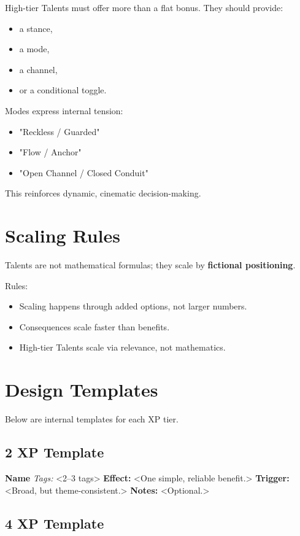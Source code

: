 \documentclass[11pt]{book}
\begin{document}
High-tier Talents must offer more than a flat bonus.
They should provide:
\begin{itemize}
    \item a stance,
    \item a mode,
    \item a channel,
    \item or a conditional toggle.
\end{itemize}

Modes express internal tension:
\begin{itemize}
    \item "Reckless / Guarded"
    \item "Flow / Anchor"
    \item "Open Channel / Closed Conduit"
\end{itemize}

This reinforces dynamic, cinematic decision-making.

\section{Scaling Rules}

Talents are not mathematical formulas; they scale by \textbf{fictional positioning}.

Rules:
\begin{itemize}
    \item Scaling happens through added options, not larger numbers.
    \item Consequences scale faster than benefits.
    \item High-tier Talents scale via relevance, not mathematics.
\end{itemize}

\section{Design Templates}

Below are internal templates for each XP tier.

\subsection{2 XP Template}

\textbf{Name}  
\emph{Tags:} <2--3 tags>  
\textbf{Effect:} <One simple, reliable benefit.>  
\textbf{Trigger:} <Broad, but theme-consistent.>  
\textbf{Notes:} <Optional.>

\subsection{4 XP Template}
\end{document}
